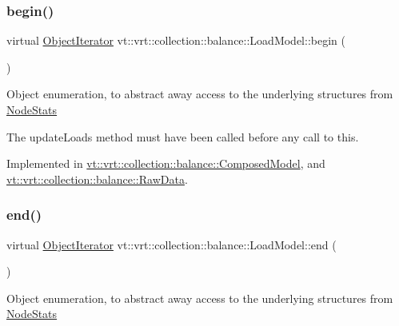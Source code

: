 \subsubsection{\texorpdfstring{begin()}{begin()}}
{\footnotesize\ttfamily virtual \hyperlink{classvt_1_1vrt_1_1collection_1_1balance_1_1_object_iterator}{Object\+Iterator} vt\+::vrt\+::collection\+::balance\+::\+Load\+Model\+::begin (\begin{DoxyParamCaption}{ }\end{DoxyParamCaption})\hspace{0.3cm}{\ttfamily [pure virtual]}}

Object enumeration, to abstract away access to the underlying structures from \hyperlink{structvt_1_1vrt_1_1collection_1_1balance_1_1_node_stats}{Node\+Stats}

The {\ttfamily update\+Loads} method must have been called before any call to this. 

Implemented in \hyperlink{classvt_1_1vrt_1_1collection_1_1balance_1_1_composed_model_a8f34205887c08a22a1e5bef6ee358f2b}{vt\+::vrt\+::collection\+::balance\+::\+Composed\+Model}, and \hyperlink{structvt_1_1vrt_1_1collection_1_1balance_1_1_raw_data_a54351249212ade8b2d25a857e71b256f}{vt\+::vrt\+::collection\+::balance\+::\+Raw\+Data}.

\mbox{\label{classvt_1_1vrt_1_1collection_1_1balance_1_1_load_model_a8474fb097bddbd75711e1e8d74084651}} 
\subsubsection{\texorpdfstring{end()}{end()}}
{\footnotesize\ttfamily virtual \hyperlink{classvt_1_1vrt_1_1collection_1_1balance_1_1_object_iterator}{Object\+Iterator} vt\+::vrt\+::collection\+::balance\+::\+Load\+Model\+::end (\begin{DoxyParamCaption}{ }\end{DoxyParamCaption})\hspace{0.3cm}{\ttfamily [pure virtual]}}

Object enumeration, to abstract away access to the underlying structures from \hyperlink{structvt_1_1vrt_1_1collection_1_1balance_1_1_node_stats}{Node\+Stats}

